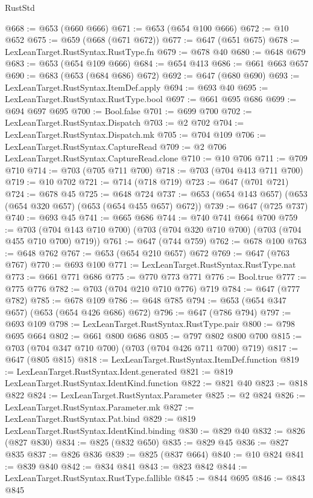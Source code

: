 \begin{lexlean}{RustStd}
\begin{coremodule}
@668 := @653 (@660 @666)
@671 := @653 (@654 @100 @666)
@672 := @10 @652
@675 := @659 (@668 (@671 @672))
@677 := @647 (@651 @675)
@678 := LexLeanTarget.RustSyntax.RustType.fn
@679 := @678 @40
@680 := @648 @679
@683 := @653 (@654 @109 @666)
@684 := @654 @413
@686 := @661 @663 @657
@690 := @683 (@653 (@684 @686) @672)
@692 := @647 (@680 @690)
@693 := LexLeanTarget.RustSyntax.ItemDef.apply
@694 := @693 @40
@695 := LexLeanTarget.RustSyntax.RustType.bool
@697 := @661 @695 @686
@699 := @694 @697 @695
@700 := Bool.false
@701 := @699 @700
@702 := LexLeanTarget.RustSyntax.Dispatch
@703 := @2 @702
@704 := LexLeanTarget.RustSyntax.Dispatch.mk
@705 := @704 @109
@706 := LexLeanTarget.RustSyntax.CaptureRead
@709 := @2 @706 LexLeanTarget.RustSyntax.CaptureRead.clone
@710 := @10 @706
@711 := @709 @710
@714 := @703 (@705 @711 @700)
@718 := @703 (@704 @413 @711 @700)
@719 := @10 @702
@721 := @714 (@718 @719)
@723 := @647 (@701 @721)
@724 := @678 @45
@725 := @648 @724
@737 := @653 (@654 @143 @657) (@653 (@654 @320 @657) (@653 (@654 @455 @657) @672))
@739 := @647 (@725 @737)
@740 := @693 @45
@741 := @665 @686
@744 := @740 @741 @664 @700
@759 := @703 (@704 @143 @710 @700) (@703 (@704 @320 @710 @700) (@703 (@704 @455 @710 @700) @719))
@761 := @647 (@744 @759)
@762 := @678 @100
@763 := @648 @762
@767 := @653 (@654 @210 @657) @672
@769 := @647 (@763 @767)
@770 := @693 @100
@771 := LexLeanTarget.RustSyntax.RustType.nat
@773 := @661 @771 @686
@775 := @770 @773 @771
@776 := Bool.true
@777 := @775 @776
@782 := @703 (@704 @210 @710 @776) @719
@784 := @647 (@777 @782)
@785 := @678 @109
@786 := @648 @785
@794 := @653 (@654 @347 @657) (@653 (@654 @426 @686) @672)
@796 := @647 (@786 @794)
@797 := @693 @109
@798 := LexLeanTarget.RustSyntax.RustType.pair
@800 := @798 @695 @664
@802 := @661 @800 @686
@805 := @797 @802 @800 @700
@815 := @703 (@704 @347 @710 @700) (@703 (@704 @426 @711 @700) @719)
@817 := @647 (@805 @815)
@818 := LexLeanTarget.RustSyntax.ItemDef.function
@819 := LexLeanTarget.RustSyntax.Ident.generated
@821 := @819 LexLeanTarget.RustSyntax.IdentKind.function
@822 := @821 @40
@823 := @818 @822
@824 := LexLeanTarget.RustSyntax.Parameter
@825 := @2 @824
@826 := LexLeanTarget.RustSyntax.Parameter.mk
@827 := LexLeanTarget.RustSyntax.Pat.bind
@829 := @819 LexLeanTarget.RustSyntax.IdentKind.binding
@830 := @829 @40
@832 := @826 (@827 @830)
@834 := @825 (@832 @650)
@835 := @829 @45
@836 := @827 @835
@837 := @826 @836
@839 := @825 (@837 @664)
@840 := @10 @824
@841 := @839 @840
@842 := @834 @841
@843 := @823 @842
@844 := LexLeanTarget.RustSyntax.RustType.fallible
@845 := @844 @695
@846 := @843 @845

\end{coremodule}
\end{lexlean}
